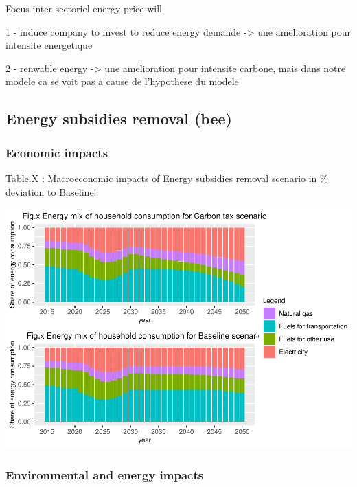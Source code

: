 \documentclass[
]{article}
\begin{document}
Focus inter-sectoriel energy price will

1 - induce company to invest to reduce energy demande -\textgreater{}
une amelioration pour intensite energetique

2 - renwable energy -\textgreater{} une amelioration pour intensite
carbone, mais dans notre modele ca se voit pas a cause de l'hypothese du
modele

\hypertarget{energy-subsidies-removal-bee}{%
\subsection{Energy subsidies removal
(bee)}\label{energy-subsidies-removal-bee}}

\hypertarget{economic-impacts}{%
\subsubsection{Economic impacts}\label{economic-impacts}}

Table.X : Macroeconomic impacts of Energy subsidies removal scenario in
\% deviation to Baseline!

\includegraphics{Modele-ThreeMe-Tunisie_Sequeira_Valilou_Wang_files/figure-latex/unnamed-chunk-24-1.pdf}

\hypertarget{environmental-and-energy-impacts}{%
\subsubsection{Environmental and energy
impacts}\label{environmental-and-energy-impacts}}
\end{document}

